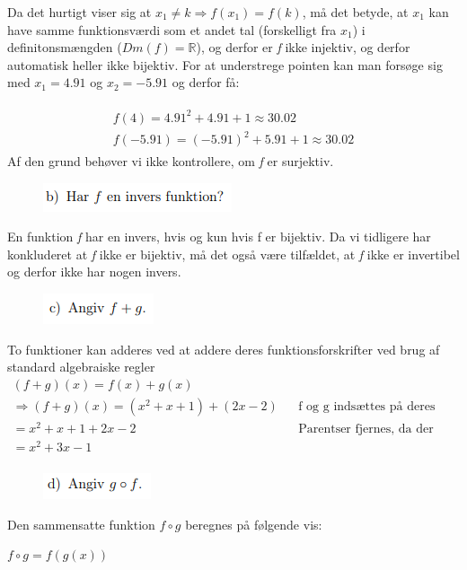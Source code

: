 \documentclass{article}
\begin{document}
Da det hurtigt viser sig at $x_1 \neq k \Rightarrow f(x_1) = f(k)$, må det betyde, at $x_1$ kan have samme funktionsværdi som et andet tal (forskelligt fra $x_1$) i definitonsmængden ($Dm(f) = \mathbb{R}$), og derfor er \emph{f} ikke injektiv, og derfor automatisk heller ikke bijektiv. For at understrege pointen kan man forsøge sig med $x_1 = 4.91$ og $x_2 = -5.91$ og derfor få:

\begin{align*}
\begin{split}
f(4) = 4.91^2 + 4.91 + 1 \approx 30.02  \\
f(-5.91) = (-5.91)^2 + 5.91 + 1 \approx 30.02
\end{split}
\end{align*}
Af den grund behøver vi ikke kontrollere, om \emph{f} er surjektiv.


\begin{figure}[h]
\includegraphics[scale=1]{opgb}
\end{figure}

En funktion \emph{f} har en invers, hvis og kun hvis f er bijektiv. Da vi tidligere har konkluderet at \emph{f} ikke er bijektiv, må det også være tilfældet, at \emph{f} ikke er invertibel og derfor ikke har nogen invers.

\begin{figure}[h]
\includegraphics[scale=1]{opgc}
\end{figure}
To funktioner kan adderes ved at addere deres funktionsforskrifter ved brug af standard algebraiske regler
\begin{align*}
(f+g)(x) = f(x) + g(x) \\
\Rightarrow (f+g)(x) = (x^2 + x + 1) + (2x - 2) && \text{f og g indsættes på deres pladser} \\
= x^2 + x + 1 + 2x - 2 && \text{Parentser fjernes, da der kun indgår + mellem dem} \\
= x^2 + 3x - 1 \\
\end{align*}

\begin{figure}[h]
\includegraphics[scale=1]{opgd}
\end{figure}
Den sammensatte funktion $f \circ g$ beregnes på følgende vis:
\par
\begin{center}
\begin{math}
f \circ g = f(g(x))
\end{math}
\end{center}
\end{document}

